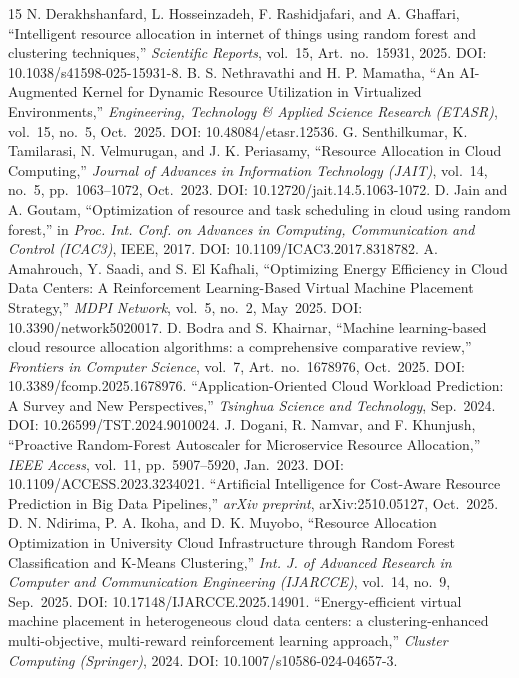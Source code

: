 \documentclass[conference]{IEEEtran}
\begin{document}
\begin{thebibliography}{15}
 N. Derakhshanfard, L. Hosseinzadeh, F. Rashidjafari, and A. Ghaffari, ``Intelligent resource allocation in internet of things using random forest and clustering techniques,'' \textit{Scientific Reports}, vol.~15, Art.~no.~15931, 2025. DOI: 10.1038/s41598-025-15931-8.
 B. S. Nethravathi and H. P. Mamatha, ``An AI-Augmented Kernel for Dynamic Resource Utilization in Virtualized Environments,'' \textit{Engineering, Technology \& Applied Science Research (ETASR)}, vol.~15, no.~5, Oct.~2025. DOI: 10.48084/etasr.12536.
 G. Senthilkumar, K. Tamilarasi, N. Velmurugan, and J. K. Periasamy, ``Resource Allocation in Cloud Computing,'' \textit{Journal of Advances in Information Technology (JAIT)}, vol.~14, no.~5, pp.~1063--1072, Oct.~2023. DOI: 10.12720/jait.14.5.1063-1072.
 D. Jain and A. Goutam, ``Optimization of resource and task scheduling in cloud using random forest,'' in \textit{Proc. Int. Conf. on Advances in Computing, Communication and Control (ICAC3)}, IEEE, 2017. DOI: 10.1109/ICAC3.2017.8318782.
 A. Amahrouch, Y. Saadi, and S. El Kafhali, ``Optimizing Energy Efficiency in Cloud Data Centers: A Reinforcement Learning-Based Virtual Machine Placement Strategy,'' \textit{MDPI Network}, vol.~5, no.~2, May~2025. DOI: 10.3390/network5020017.
 D. Bodra and S. Khairnar, ``Machine learning-based cloud resource allocation algorithms: a comprehensive comparative review,'' \textit{Frontiers in Computer Science}, vol.~7, Art.~no.~1678976, Oct.~2025. DOI: 10.3389/fcomp.2025.1678976.
 ``Application-Oriented Cloud Workload Prediction: A Survey and New Perspectives,'' \textit{Tsinghua Science and Technology}, Sep.~2024. DOI: 10.26599/TST.2024.9010024.
 J. Dogani, R. Namvar, and F. Khunjush, ``Proactive Random-Forest Autoscaler for Microservice Resource Allocation,'' \textit{IEEE Access}, vol.~11, pp.~5907--5920, Jan.~2023. DOI: 10.1109/ACCESS.2023.3234021.
 ``Artificial Intelligence for Cost-Aware Resource Prediction in Big Data Pipelines,'' \textit{arXiv preprint}, arXiv:2510.05127, Oct.~2025.
 D. N. Ndirima, P. A. Ikoha, and D. K. Muyobo, ``Resource Allocation Optimization in University Cloud Infrastructure through Random Forest Classification and K-Means Clustering,'' \textit{Int. J. of Advanced Research in Computer and Communication Engineering (IJARCCE)}, vol.~14, no.~9, Sep.~2025. DOI: 10.17148/IJARCCE.2025.14901.
 ``Energy-efficient virtual machine placement in heterogeneous cloud data centers: a clustering-enhanced multi-objective, multi-reward reinforcement learning approach,'' \textit{Cluster Computing (Springer)}, 2024. DOI: 10.1007/s10586-024-04657-3.

\end{thebibliography}
\end{document}
